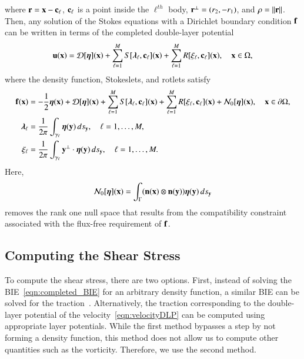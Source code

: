 \documentclass[preprint, 10pt]{elsarticle}
\begin{document}
where  ${\mathbf{r}} = {\mathbf{x}} - {\mathbf{c}}_\ell$, ${\mathbf{c}}_\ell$ is a point inside the
$\ell^{th}$ body, ${\mathbf{r}}^\perp = (r_2,-r_1)$, and $\rho = \|{\mathbf{r}}\|$.  Then,
any solution of the Stokes equations with a Dirichlet boundary condition
${\mathbf{f}}$ can be written in terms of the completed double-layer potential
\begin{align}
  \label{eqn:completed_DLP}
  {\mathbf{u}}({\mathbf{x}}) = {\mathcal{D}}[{\boldsymbol\eta}]({\mathbf{x}}) + 
    \sum_{\ell=1}^{M} S[{\boldsymbol\lambda}_\ell,{\mathbf{c}}_\ell]({\mathbf{x}}) +
    \sum_{\ell=1}^{M} R[\xi_\ell,{\mathbf{c}}_\ell]({\mathbf{x}}), \quad {\mathbf{x}} \in \Omega,
\end{align}
where the density function, Stokeslets, and rotlets satisfy
\begin{subequations}
\label{eqn:completed_BIE}
\begin{align}
  {\mathbf{f}}({\mathbf{x}}) &= -\frac{1}{2}{\boldsymbol\eta}({\mathbf{x}}) + {\mathcal{D}}[{\boldsymbol\eta}]({\mathbf{x}}) + 
      \sum_{\ell=1}^{M} S[{\boldsymbol\lambda}_\ell,{\mathbf{c}}_\ell]({\mathbf{x}}) +
      \sum_{\ell=1}^{M} R[\xi_\ell,{\mathbf{c}}_\ell]({\mathbf{x}}) + {\mathcal{N}}_0[{\boldsymbol\eta}]({\mathbf{x}}),
      \quad {\mathbf{x}} \in {\partial}\Omega, 
      \label{eqn:DLP}\\
  {\boldsymbol\lambda}_\ell &= \frac{1}{2\pi}\int_{\gamma_\ell} {\boldsymbol\eta}({\mathbf{y}}) \, ds_{\mathbf{y}},
  \quad \ell=1,\ldots,M,
  \label{eqn:stokeslet} \\
  \xi_\ell &= \frac{1}{2\pi}\int_{\gamma_\ell} {\mathbf{y}}^\perp \cdot {\boldsymbol\eta}({\mathbf{y}})
  \, ds_{\mathbf{y}}, \quad \ell=1,\ldots,M.
  \label{eqn:rotlet}
\end{align}
\end{subequations}
Here,
\begin{align*}
  {\mathcal{N}}_0[{\boldsymbol\eta}]({\mathbf{x}}) = \int_{\Gamma} 
    ({\mathbf{n}}({\mathbf{x}}) \otimes {\mathbf{n}}({\mathbf{y}})){\boldsymbol\eta}({\mathbf{y}}) \, ds_{\mathbf{y}}
\end{align*}
removes the rank one null space that results from the compatibility
constraint associated with the flux-free requirement of ${\mathbf{f}}$.


\subsection{Computing the Shear Stress}
\label{sec:shearStressLP}
To compute the shear stress, there are two options.  First, instead of
solving the BIE~\eqref{eqn:completed_BIE} for an arbitrary density
function, a similar BIE can be solved for the
traction~\cite{mit-spa2016}.  Alternatively, the traction corresponding
to the double-layer potential of the velocity~\eqref{eqn:velocityDLP}
can be computed using appropriate layer potentials.  While the first
method bypasses a step by not forming a density function, this method
does not allow us to compute other quantities such as the vorticity.
Therefore, we use the second method.
\end{document}
